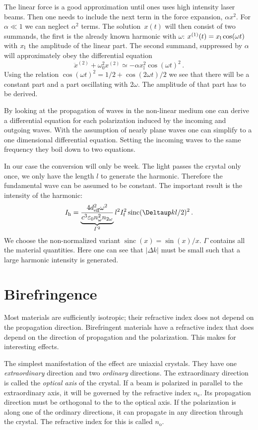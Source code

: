 \documentclass[11pt, english, fleqn, DIV=15, headinclude, BCOR=2cm]{scrreprt}
\DeclareMathOperator\sinc{sinc}
\begin{document}
The linear force is a good approximation until ones uses high intensity laser
beams. Then one needs to include the next term in the force expansion, $\alpha
x^2$. For $\alpha \ll 1$ we can neglect $\alpha^2$ terms. The solution~$x(t)$
will then consist of two summands, the first is the already known harmonic with
$\omega$: $x^{(1)}(t) = x_\text l \cos(\omega t)$ with $x_\text l$ the
amplitude of the linear part. The second summand, suppressed by $\alpha$ will
approximately obey the differential equation
\[
    \ddot x^{(2)} + \omega_0^2 x^{(2)} \simeq - \alpha x_\mathrm l^2
    \cos(\omega t)^2 \,.
\]
Using the relation $\cos(\omega t)^2 = 1/2 + \cos(2 \omega t)/2$ we see that
there will be a constant part and a part oscillating with $2 \omega$. The
amplitude of that part has to be derived.

By looking at the propagation of waves in the non-linear medium one can derive
a differential equation for each polarization induced by the incoming and
outgoing waves. With the assumption of nearly plane waves one can simplify to a
one dimensional differential equation. Setting the incoming waves to the same
frequency they boil down to two equations.

In our case the conversion will only be week. The light passes the crystal only
once, we only have the length $l$ to generate the harmonic. Therefore the
fundamental wave can be assumed to be constant. The important result is the
intensity of the harmonic:
\[
    I_\text h = \underbrace{\frac{4 d_\text{eff}^2 \omega^2}{c^3 \varepsilon_0
    n_\omega^2 n_{2\omega}}}_{\Gamma^2} l^2 I_\mathrm f^2 \sinc(\Deltaup k l /
    2)^2 \,.
\]
We choose the non-normalized variant $\sinc(x) = \sin(x)/x$. $\Gamma$ contains
all the material quantities. Here one can see that $|\Delta k|$ must be small
such that a large harmonic intensity is generated.

\section{Birefringence}

Most materials are sufficiently isotropic; their refractive index does not
depend on the propagation direction. Birefringent materials have a refractive
index that does depend on the direction of propagation and the polarization.
This makes for interesting effects.

The simplest manifestation of the effect are uniaxial crystals. They have one
\emph{extraordinary} direction and two \emph{ordinary} directions. The
extraordinary direction is called the \emph{optical axis} of the crystal. If a
beam is polarized in parallel to the extraordinary axis, it will be governed by
the refractive index $n_\mathrm e$. Its propagation direction must be
orthogonal to the to the optical axis. If the polarization is along one of the
ordinary directions, it can propagate in any direction through the crystal. The
refractive index for this is called $n_\mathrm o$.
\end{document}
